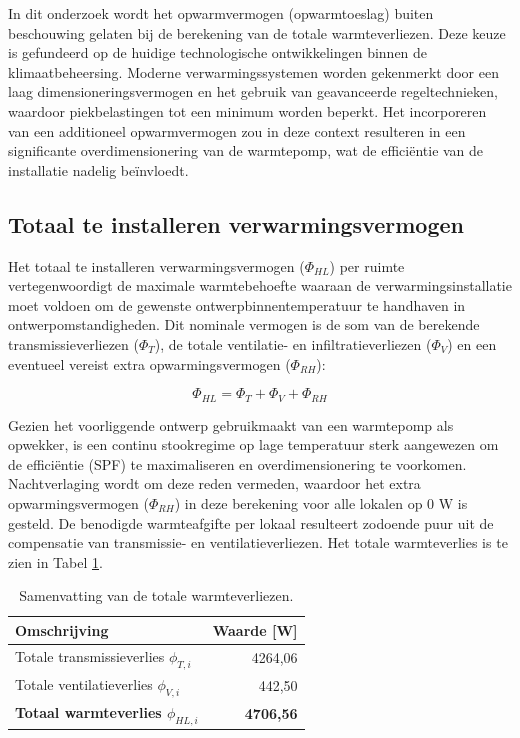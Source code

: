 \documentclass[a4paper,12pt]{article}
\begin{document}
In dit onderzoek wordt het opwarmvermogen (opwarmtoeslag) buiten beschouwing gelaten bij de berekening van de totale warmteverliezen. Deze keuze is gefundeerd op de huidige technologische ontwikkelingen binnen de klimaatbeheersing. Moderne verwarmingssystemen worden gekenmerkt door een laag dimensioneringsvermogen en het gebruik van geavanceerde regeltechnieken, waardoor piekbelastingen tot een minimum worden beperkt. Het incorporeren van een additioneel opwarmvermogen zou in deze context resulteren in een significante overdimensionering van de warmtepomp, wat de efficiëntie van de installatie nadelig beïnvloedt.

\subsection{Totaal te installeren verwarmingsvermogen}

Het totaal te installeren verwarmingsvermogen ($\Phi_{HL}$) per ruimte vertegenwoordigt de maximale warmtebehoefte waaraan de verwarmingsinstallatie moet voldoen om de gewenste ontwerpbinnentemperatuur te handhaven in ontwerpomstandigheden. Dit nominale vermogen is de som van de berekende transmissieverliezen ($\Phi_T$), de totale ventilatie- en infiltratieverliezen ($\Phi_V$) en een eventueel vereist extra opwarmingsvermogen ($\Phi_{RH}$):

\begin{equation}
    \Phi_{HL} = \Phi_T + \Phi_V + \Phi_{RH}
\end{equation}

Gezien het voorliggende ontwerp gebruikmaakt van een warmtepomp als opwekker, is een continu stookregime op lage temperatuur sterk aangewezen om de efficiëntie (SPF) te maximaliseren en overdimensionering te voorkomen. Nachtverlaging wordt om deze reden vermeden, waardoor het extra opwarmingsvermogen ($\Phi_{RH}$) in deze berekening voor alle lokalen op 0 W is gesteld. De benodigde warmteafgifte per lokaal resulteert zodoende puur uit de compensatie van transmissie- en ventilatieverliezen. Het totale warmteverlies is te zien in Tabel \ref{tab:samenvatting_verliezen}.

\begin{table}[h]
\centering
\begin{tabular}{lr} %
\toprule
\rowcolor{gray!20} \textbf{Omschrijving} & \textbf{Waarde [W]} \\ \midrule
Totale transmissieverlies $\phi_{T,i}$ & 4264,06 \\
Totale ventilatieverlies $\phi_{V,i}$  & 442,50 \\ \midrule
\textbf{Totaal warmteverlies $\phi_{HL,i}$} & \textbf{4706,56} \\ \bottomrule
\end{tabular}
\caption{Samenvatting van de totale warmteverliezen.}
\label{tab:samenvatting_verliezen}
\end{table}
\end{document}
